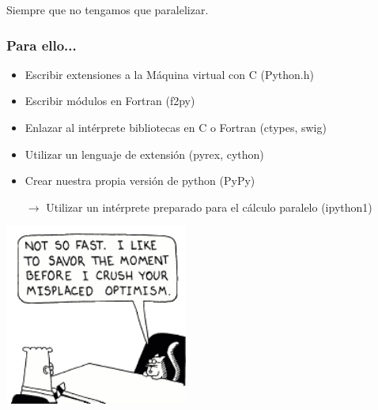 \documentclass{beamer}
\begin{document}
\begin{frame}
  \begin{center}
    \begin{Huge}
      Siempre que no tengamos que paralelizar.
    \end{Huge}
  \end{center}
\end{frame}


\begin{frame}
  \frametitle{Para ello...}
  \begin{itemize}
  \item Escribir extensiones a la Máquina virtual con C (Python.h)
  \item Escribir módulos en Fortran (f2py)
  \item Enlazar al intérprete bibliotecas en C o Fortran (ctypes,
    swig)
  \item Utilizar un lenguaje de extensión (pyrex, cython)
  \item Crear nuestra propia versión de python (PyPy)
  \item[$\rightarrow$] Utilizar un intérprete preparado para el cálculo paralelo
    (ipython1)
  \end{itemize}
\end{frame}

\begin{frame}
\begin{center}
 \includegraphics[width=6cm]{files/catbert.png}\\
\end{center}
\end{frame}


\begin{frame}
  \begin{center}
    \begin{Huge}
    \end{Huge}
  \end{center}
\end{frame}
\end{document}
